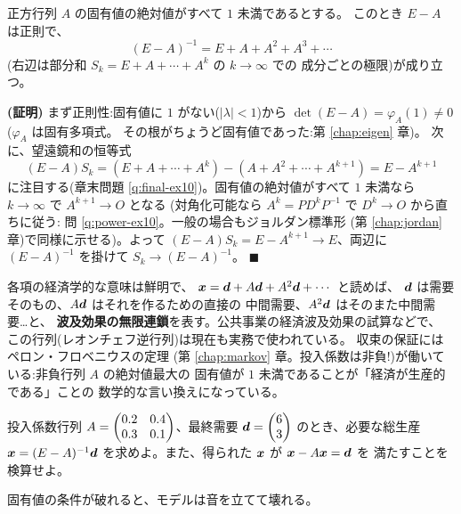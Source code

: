 \begin{teiri}[ノイマン級数]\label{thm:final-neumann}
正方行列 $A$ の固有値の絶対値がすべて $1$ 未満であるとする。
このとき $E - A$ は正則で、
\[
(E - A)^{-1} = E + A + A^2 + A^3 + \cdots
\]
(右辺は部分和 $S_k = E + A + \cdots + A^k$ の $k \to \infty$ での
成分ごとの極限)が成り立つ。
\end{teiri}

\noindent\textbf{(証明)}\quad
まず正則性:固有値に $1$ がない($|\lambda| < 1$)から
$\det(E - A) = \varphi_A(1) \neq 0$($\varphi_A$ は固有多項式。
その根がちょうど固有値であった:第 \ref{chap:eigen} 章)。
次に、望遠鏡和の恒等式
\[
(E - A)S_k = (E + A + \cdots + A^k) - (A + A^2 + \cdots + A^{k+1})
= E - A^{k+1}
\]
に注目する(章末問題 \ref{q:final-ex10})。固有値の絶対値がすべて
$1$ 未満なら $k \to \infty$ で $A^{k+1} \to O$ となる
(対角化可能なら $A^k = PD^kP^{-1}$ で $D^k \to O$ から直ちに従う:
問 \ref{q:power-ex10}。一般の場合もジョルダン標準形
(第 \ref{chap:jordan} 章)で同様に示せる)。よって
$(E - A)S_k = E - A^{k+1} \to E$、両辺に $(E - A)^{-1}$ を掛けて
$S_k \to (E - A)^{-1}$。 $\blacksquare$

各項の経済学的な意味は鮮明で、
$\bm{x} = \bm{d} + A\bm{d} + A^2\bm{d} + \cdots$ と読めば、
$\bm{d}$ は需要そのもの、$A\bm{d}$ はそれを作るための直接の
中間需要、$A^2\bm{d}$ はそのまた中間需要…と、
\textbf{波及効果の無限連鎖}を表す。公共事業の経済波及効果の試算などで、
この行列(レオンチェフ逆行列)は現在も実務で使われている。
収束の保証にはペロン・フロベニウスの定理
(第 \ref{chap:markov} 章。投入係数は非負!)が働いている:非負行列 $A$ の絶対値最大の
固有値が $1$ 未満であることが「経済が生産的である」ことの
数学的な言い換えになっている。

\begin{mondai}\label{q:leontief}
投入係数行列 $A = \begin{pmatrix}0.2 & 0.4 \\ 0.3 & 0.1\end{pmatrix}$、最終需要
$\bm{d} = \begin{pmatrix}6 \\ 3\end{pmatrix}$ のとき、必要な総生産 $\bm{x} = (E - A)^{-1}\bm{d}$
を求めよ。また、得られた $\bm{x}$ が $\bm{x} - A\bm{x} = \bm{d}$ を
満たすことを検算せよ。
\end{mondai}

固有値の条件が破れると、モデルは音を立てて壊れる。

